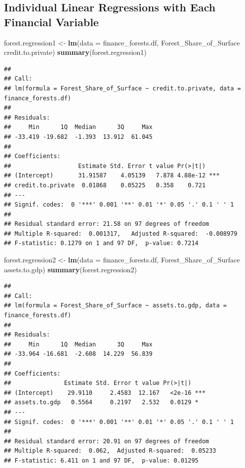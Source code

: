 \documentclass[
  12pt,
]{article}
\newenvironment{Shaded}{\begin{snugshade}}{\end{snugshade}}
\newcommand{\DataTypeTok}[1]{\textcolor[rgb]{0.13,0.29,0.53}{#1}}
\newcommand{\KeywordTok}[1]{\textcolor[rgb]{0.13,0.29,0.53}{\textbf{#1}}}
\newcommand{\NormalTok}[1]{#1}
\newcommand{\OperatorTok}[1]{\textcolor[rgb]{0.81,0.36,0.00}{\textbf{#1}}}
\newcommand{\StringTok}[1]{\textcolor[rgb]{0.31,0.60,0.02}{#1}}
\begin{document}
\hypertarget{individual-linear-regressions-with-each-financial-variable}{%
\subsection{Individual Linear Regressions with Each Financial
Variable}\label{individual-linear-regressions-with-each-financial-variable}}

\begin{Shaded}
\begin{Highlighting}[]
\NormalTok{forest.regression1 <-}\StringTok{ }\KeywordTok{lm}\NormalTok{(}\DataTypeTok{data =}\NormalTok{ finance_forests.df, Forest_Share_of_Surface }\OperatorTok{~}\StringTok{ }\NormalTok{credit.to.private)}
\KeywordTok{summary}\NormalTok{(forest.regression1)}
\end{Highlighting}
\end{Shaded}

\begin{verbatim}
## 
## Call:
## lm(formula = Forest_Share_of_Surface ~ credit.to.private, data = finance_forests.df)
## 
## Residuals:
##     Min      1Q  Median      3Q     Max 
## -33.419 -19.682  -1.393  13.912  61.045 
## 
## Coefficients:
##                   Estimate Std. Error t value Pr(>|t|)    
## (Intercept)       31.91587    4.05139   7.878 4.88e-12 ***
## credit.to.private  0.01868    0.05225   0.358    0.721    
## ---
## Signif. codes:  0 '***' 0.001 '**' 0.01 '*' 0.05 '.' 0.1 ' ' 1
## 
## Residual standard error: 21.58 on 97 degrees of freedom
## Multiple R-squared:  0.001317,   Adjusted R-squared:  -0.008979 
## F-statistic: 0.1279 on 1 and 97 DF,  p-value: 0.7214
\end{verbatim}

\begin{Shaded}
\begin{Highlighting}[]
\NormalTok{forest.regression2 <-}\StringTok{ }\KeywordTok{lm}\NormalTok{(}\DataTypeTok{data =}\NormalTok{ finance_forests.df, Forest_Share_of_Surface }\OperatorTok{~}\StringTok{ }\NormalTok{assets.to.gdp)}
\KeywordTok{summary}\NormalTok{(forest.regression2)}
\end{Highlighting}
\end{Shaded}

\begin{verbatim}
## 
## Call:
## lm(formula = Forest_Share_of_Surface ~ assets.to.gdp, data = finance_forests.df)
## 
## Residuals:
##     Min      1Q  Median      3Q     Max 
## -33.964 -16.681  -2.608  14.229  56.839 
## 
## Coefficients:
##               Estimate Std. Error t value Pr(>|t|)    
## (Intercept)    29.9110     2.4583  12.167   <2e-16 ***
## assets.to.gdp   0.5564     0.2197   2.532   0.0129 *  
## ---
## Signif. codes:  0 '***' 0.001 '**' 0.01 '*' 0.05 '.' 0.1 ' ' 1
## 
## Residual standard error: 20.91 on 97 degrees of freedom
## Multiple R-squared:  0.062,  Adjusted R-squared:  0.05233 
## F-statistic: 6.411 on 1 and 97 DF,  p-value: 0.01295
\end{verbatim}
\end{document}
